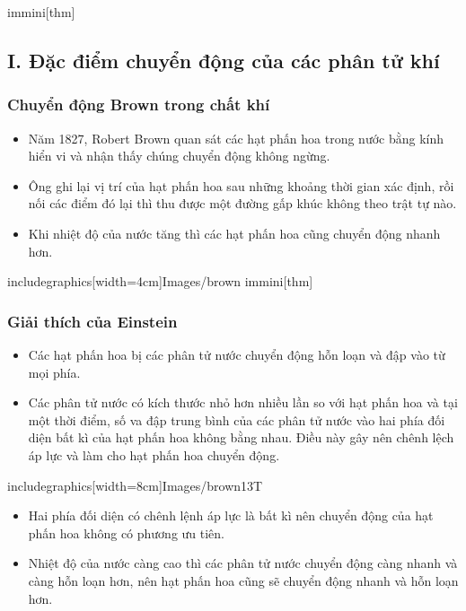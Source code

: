 immini[thm]{\subsection*{I. Đặc điểm chuyển động của các phân tử khí}
\subsubsection{Chuyển động Brown trong chất khí}
\begin{itemize}
	\item Năm 1827, Robert Brown quan sát các hạt phấn hoa trong nước bằng kính hiển vi và nhận thấy chúng chuyển động không ngừng. 
	\item Ông ghi lại vị trí của hạt phấn hoa sau những khoảng thời gian xác định, rồi nối các điểm đó lại thì thu được một đường gấp khúc không theo trật tự nào.
	\item Khi nhiệt độ của nước tăng thì các hạt phấn hoa cũng chuyển động nhanh hơn.	
\end{itemize}}{includegraphics[width=4cm]{Images/brown}}
immini[thm]{\subsubsection{Giải thích của Einstein}
\begin{itemize}
	\item Các hạt phấn hoa bị các phân tử nước chuyển động hỗn loạn và đập vào từ mọi phía.
	\item Các phân tử nước có kích thước nhỏ hơn nhiều lần so với hạt phấn hoa và tại một thời điểm, số va đập trung bình của các phân tử nước vào hai phía đối diện bất kì của hạt phấn hoa không bằng nhau. Điều này gây nên chênh lệch áp lực và làm cho hạt phấn hoa chuyển động.
\end{itemize}
}
{
includegraphics[width=8cm]{Images/brown13T}
}
\begin{itemize}
	\item Hai phía đối diện có chênh lệnh áp lực là bất kì nên chuyển động của hạt phấn hoa không có phương ưu tiên.
	\item Nhiệt độ của nước càng cao thì các phân tử nước chuyển động càng nhanh và càng hỗn loạn hơn, nên hạt phấn hoa cũng sẽ chuyển động nhanh và hỗn loạn hơn.
\end{itemize}

